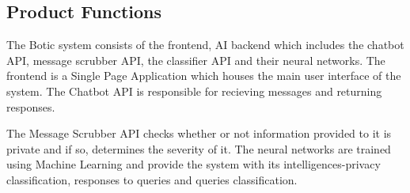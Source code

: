 \documentclass[11pt]{article}
\begin{document}



\subsection{Product Functions}%

The Botic system consists of the frontend, AI backend which includes the chatbot API, message scrubber API, the classifier API and their neural networks. The frontend is a Single Page Application which houses the main user interface of the system. The Chatbot API is responsible for recieving messages and returning responses.\par

The Message Scrubber API checks whether or not information provided to it is private and if so, determines the severity of it. The neural networks are trained using Machine Learning and provide the system with its intelligences-privacy classification, responses to queries and queries classification.

\end{document}
